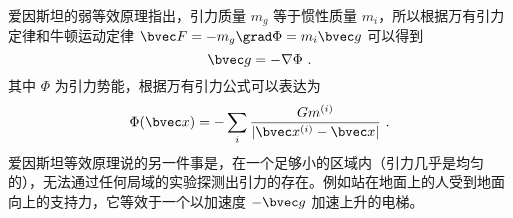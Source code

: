 

爱因斯坦的弱等效原理指出，引力质量 $m_g$ 等于惯性质量 $m_i$，所以根据万有引力定律和牛顿运动定律 $\bvec F=-m_g \grad \Phi = m_i \bvec g$ 可以得到 
\begin{equation}
\bvec g = -\nabla\Phi~.
\end{equation}
其中 $\Phi$ 为引力势能，根据万有引力公式可以表达为
\begin{equation}
\Phi(\bvec x)=-\sum_{i} \frac{G m^{(i)}}{|\bvec x^{(i)}-\bvec x|}~.
\end{equation}
爱因斯坦等效原理说的另一件事是，在一个足够小的区域内（引力几乎是均匀的），无法通过任何局域的实验探测出引力的存在。例如站在地面上的人受到地面向上的支持力，它等效于一个以加速度 $-\bvec g$ 加速上升的电梯。